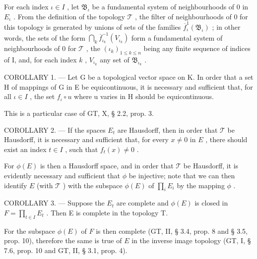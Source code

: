 For each index \(\iota \in I\) , let \(\mathfrak{B}_{\iota}\) be a fundamental system of neighbourhoods of 0 in \(E_{\iota}\) . From the definition of the topology \(\mathcal{T}\) , the filter of neighbourhoods of 0 for this topology is generated by unions of sets of the families \(\overline{f}_{\iota}^{1}(\mathfrak{B}_{\iota})\) ; in other words, the sets of the form \(\bigcap_{k} \overline{f}_{\iota_k}^{-1}(V_{\iota_k})\) form a fundamental system of neighbourhoods of 0 for \(\mathcal{T}\) , the \((\iota_k)_{1 \leqslant k \leqslant n}\) being any finite sequence of indices of I, and, for each index \(k\) , \(V_{\iota_k}\) any set of \(\mathfrak{B}_{\iota_k}\) .

COROLLARY 1. --- Let G be a topological vector space on K. In order that a set H of mappings of G in E be equicontinuous, it is necessary and sufficient that, for all \(\iota \in I\) , the set \(f_{\iota} \circ u\) where u varies in H should be equicontinuous.

This is a particular case of GT, X, § 2.2, prop. 3.

COROLLARY 2. --- If the spaces \(E_{t}\) are Hausdorff, then in order that \(\mathcal{T}\) be Hausdorff, it is necessary and sufficient that, for every \(x \neq 0\) in \(E\) , there should exist an index \(t \in I\) , such that \(f_{t}(x) \neq 0\) .

For \(\phi(E)\) is then a Hausdorff space, and in order that \(\mathcal{T}\) be Hausdorff, it is evidently necessary and sufficient that \(\phi\) be injective; note that we can then identify \(E\) (with \(\mathcal{T}\) ) with the subspace \(\phi(E)\) of \(\prod_{i} E_{i}\) by the mapping \(\phi\) .

COROLLARY 3. --- Suppose the \(E_{t}\) are complete and \(\phi(E)\) is closed in \(F = \prod_{t \in I} E_{t}\) . Then E is complete in the topology T.

For the subspace \(\phi(E)\) of \(F\) is then complete (GT, II, § 3.4, prop. 8 and § 3.5, prop. 10), therefore the same is true of \(E\) in the inverse image topology (GT, I, § 7.6, prop. 10 and GT, II, § 3.1, prop. 4).

